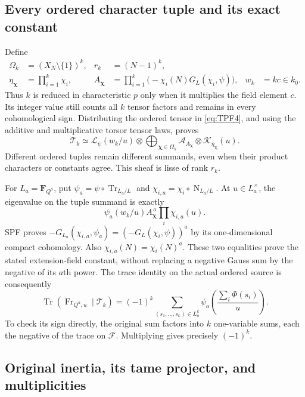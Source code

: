 \subsection{Every ordered character tuple and its exact constant}

Define
\[
 \begin{aligned}
 \Omega_k&=(X_N\setminus\{1\})^k,&
 r_k&=(N-1)^k,\\
 \eta_{\boldsymbol\chi}&=\prod_{i=1}^k\chi_i,&
 A_{\boldsymbol\chi}&=\prod_{i=1}^k
            \bigl(-\chi_i(N)G_L(\chi_i,\psi)\bigr),&
 w_k&=kc\in k_0 .
 \end{aligned}
 \tag{TPF.8}\label{eq:TPF8}
\]
Thus \(k\) is reduced in characteristic \(p\) only when it
multiplies the field element \(c\). Its integer value still
counts all \(k\) tensor factors and remains in every
cohomological sign. Distributing the ordered tensor in
\eqref{eq:TPF4}, and using the additive and multiplicative
torsor tensor laws, proves
\[
 \boxed{\displaystyle
 \mathcal T_k\simeq
 \mathcal L_\psi(w_k/u)\otimes
   \bigoplus_{\boldsymbol\chi\in\Omega_k}
        \mathcal A_{A_{\boldsymbol\chi}}
                  \otimes\mathcal K_{\eta_{\boldsymbol\chi}}(u).}
 \tag{TPF.9}\label{eq:TPF9}
\]
Different ordered tuples remain different summands, even
when their product characters or constants agree.
This sheaf is lisse of rank \(r_k\).

For \(L_a=\mathbf F_{Q^a}\), put
\(\psi_a=\psi\circ\operatorname{Tr}_{L_a/L}\) and
\(\chi_{i,a}=\chi_i\circ\operatorname{N}_{L_a/L}\).
At \(u\in L_a^\times\), the eigenvalue on the tuple summand
is exactly
\[
 \psi_a(w_k/u) A_{\boldsymbol\chi}^{\,a}
              \prod_i\chi_{i,a}(u).
 \tag{TPF.10}\label{eq:TPF10}
\]
SPF proves \(-G_{L_a}(\chi_{i,a},\psi_a)
=(-G_L(\chi_i,\psi))^a\) by its one-dimensional compact
cohomology. Also \(\chi_{i,a}(N)=\chi_i(N)^a\).
These two equalities prove the stated extension-field
constant, without replacing a negative Gauss sum by
the negative of its \(a\)th power. The trace identity on
the actual ordered source is consequently
\[
 \operatorname{Tr}(\operatorname{Fr}_{Q^a,u}\mid\mathcal T_k)
 =(-1)^k\sum_{(s_1,\ldots,s_k)\in L_a^k}
       \psi_a\left(\frac{\sum_i\Phi(s_i)}u\right).
 \tag{TPF.11}\label{eq:TPF11}
\]
To check its sign directly, the original sum factors into
\(k\) one-variable sums, each the negative of the trace on
\(\mathcal F\). Multiplying gives precisely \((-1)^k\).

\subsection{Original inertia, its tame projector, and multiplicities}

